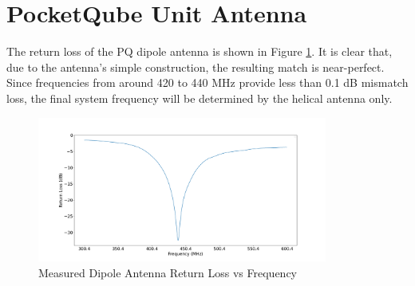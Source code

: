 \graphicspath{{./figures}}

\section{PocketQube Unit Antenna}

The return loss of the PQ dipole antenna is shown in Figure \ref{fig:dipoleReturnLoss}. It is clear that, due to the antenna's simple construction, the resulting match is near-perfect. Since frequencies from around 420 to 440 MHz provide less than 0.1 dB mismatch loss, the final system frequency will be determined by the helical antenna only.

\begin{figure}[!htb]
    \centering
    \includegraphics[width=0.85\textwidth]{dipoleReturnLoss}
    \caption{Measured Dipole Antenna Return Loss vs Frequency}
    \label{fig:dipoleReturnLoss}
  \end{figure}
